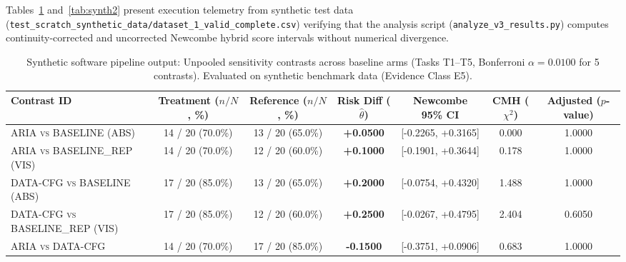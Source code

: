 \documentclass[conference]{IEEEtran}
\begin{document}
\begin{figure}[t]
\centering
{}
\vspace{4pt}
\end{figure}

Tables~\ref{tab:synth1} and~\ref{tab:synth2} present execution telemetry from synthetic test data (\texttt{test\_scratch\_synthetic\_data/dataset\_1\_valid\_complete.csv}) verifying that the analysis script (\texttt{analyze\_v3\_results.py}) computes continuity-corrected and uncorrected Newcombe hybrid score intervals without numerical divergence.

\begin{table}[ht]
\centering
\small
\caption{Synthetic software pipeline output: Unpooled sensitivity contrasts across baseline arms (Tasks T1--T5, Bonferroni $\alpha = 0.0100$ for 5 contrasts). Evaluated on synthetic benchmark data (Evidence Class E5).}
\label{tab:synth1}
\begin{tabular*}{\textwidth}{@{\extracolsep{\fill}}lcccccc@{}}
\toprule
\textbf{Contrast ID} & \shortstack{\textbf{Treatment} \\ \scriptsize($n/N$, \%)} & \shortstack{\textbf{Reference} \\ \scriptsize($n/N$, \%)} & \shortstack{\textbf{Risk Diff} \\ \scriptsize($\hat{\theta}$)} & \textbf{Newcombe 95\% CI} & \shortstack{\textbf{CMH} \\ \scriptsize($\chi^2$)} & \shortstack{\textbf{Adjusted} \\ \scriptsize($p$-value)} \\
\midrule
\textsc{ARIA vs BASELINE (ABS)}          & 14 / 20 (70.0\%) & 13 / 20 (65.0\%) & \textbf{+0.0500} & [-0.2265, +0.3165] & 0.000 & 1.0000 \\
\textsc{ARIA vs BASELINE\_REP (VIS)}      & 14 / 20 (70.0\%) & 12 / 20 (60.0\%) & \textbf{+0.1000} & [-0.1901, +0.3644] & 0.178 & 1.0000 \\
\textsc{DATA-CFG vs BASELINE (ABS)}      & 17 / 20 (85.0\%) & 13 / 20 (65.0\%) & \textbf{+0.2000} & [-0.0754, +0.4320] & 1.488 & 1.0000 \\
\textsc{DATA-CFG vs BASELINE\_REP (VIS)}  & 17 / 20 (85.0\%) & 12 / 20 (60.0\%) & \textbf{+0.2500} & [-0.0267, +0.4795] & 2.404 & 0.6050 \\
\textsc{ARIA vs DATA-CFG}               & 14 / 20 (70.0\%) & 17 / 20 (85.0\%) & \textbf{-0.1500} & [-0.3751, +0.0906] & 0.683 & 1.0000 \\
\bottomrule
\end{tabular*}
\end{table}
\end{document}
